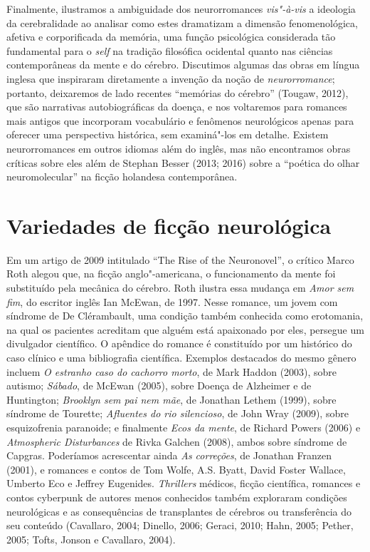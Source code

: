 Finalmente, ilustramos a ambiguidade dos neurorromances \emph{vis"-à-vis}
a ideologia da cerebralidade ao analisar como estes dramatizam a dimensão
fenomenológica, afetiva e corporificada da memória, uma função
psicológica considerada tão fundamental para o \emph{self} na tradição
filosófica ocidental quanto nas ciências contemporâneas da mente e do
cérebro. Discutimos algumas das obras em língua inglesa que inspiraram
diretamente a invenção da noção de \emph{neurorromance}; portanto,
deixaremos de lado recentes ``memórias do cérebro'' (Tougaw, 2012), que
são narrativas autobiográficas da doença, e nos voltaremos para romances
mais antigos que incorporam vocabulário e fenômenos neurológicos apenas
para oferecer uma perspectiva histórica, sem examiná"-los em detalhe.
Existem neurorromances em outros idiomas além do inglês, mas não
encontramos obras críticas sobre eles além de Stephan Besser
(2013; 2016) sobre a ``poética do olhar neuromolecular'' na ficção
holandesa contemporânea.

\section{Variedades de ficção neurológica}

Em um artigo de 2009 intitulado ``The Rise of the Neuronovel'', o
crítico Marco Roth alegou que, na ficção anglo"-americana, o
funcionamento da mente foi substituído pela mecânica do cérebro. Roth
ilustra essa mudança em \emph{Amor sem fim}, do escritor inglês Ian
McEwan, de 1997. Nesse romance, um jovem com síndrome de De Clérambault,
uma condição também conhecida como erotomania, na qual os pacientes
acreditam que alguém está apaixonado por eles, persegue um divulgador
científico. O apêndice do romance é constituído por um histórico do caso
clínico e uma bibliografia científica. Exemplos destacados do mesmo
gênero incluem \emph{O estranho caso do cachorro morto}, de Mark Haddon
(2003), sobre autismo; \emph{Sábado}, de McEwan (2005), sobre Doença de
Alzheimer e de Huntington; \emph{Brooklyn sem pai nem mãe}, de Jonathan
Lethem (1999), sobre síndrome de Tourette; \emph{Afluentes do rio
silencioso}, de John Wray (2009), sobre esquizofrenia paranoide; e
finalmente \emph{Ecos da mente}, de Richard Powers (2006) e
\emph{Atmospheric Disturbances} de Rivka Galchen (2008), ambos sobre
síndrome de Capgras. Poderíamos acrescentar ainda \emph{As correções},
de Jonathan Franzen (2001), e romances e contos de Tom Wolfe, A.S.
Byatt, David Foster Wallace, Umberto Eco e Jeffrey Eugenides.
\emph{Thrillers} médicos, ficção científica, romances e contos cyberpunk
de autores menos conhecidos também exploraram condições neurológicas e
as consequências de transplantes de cérebros ou transferência do seu
conteúdo (Cavallaro, 2004; Dinello, 2006; Geraci, 2010; Hahn, 2005;
Pether, 2005; Tofts, Jonson e Cavallaro, 2004).

